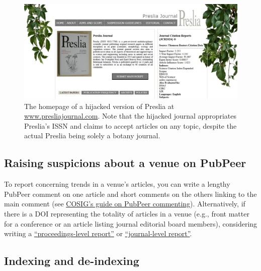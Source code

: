 \documentclass[letterpaper, 12pt]{article}
\begin{document}
\begin{figure}[h!tbp]
    \centering
    \includegraphics[width=\textwidth]{img/venues/Preslia hijacked-min.png}
    \caption*{The homepage of a hijacked version of Preslia at \href{https://presliajournal.com/}{www.presliajournal.com}. Note that the hijacked journal appropriates Preslia's ISSN and claims to accept articles on any topic, despite the actual Preslia being solely a botany journal.}
\end{figure}

\subsection*{Raising suspicions about a venue on PubPeer}

To report concerning trends in a venue's articles, you can write a lengthy PubPeer comment on one article
and short comments on the others linking to the main comment (see \href{https://osf.io/sghaq}{COSIG's guide on PubPeer commenting}).
Alternatively, if there is a DOI representing the totality of articles in a venue (e.g., front matter for a conference or an article listing journal editorial board members), considering writing a \href{https://pubpeer.com/search?q=\%22proceedings-level+report\%22}{``proceedings-level report''} or \href{https://pubpeer.com/search?q=\%22journal-level+report\%22}{``journal-level report''}.

\subsection*{Indexing and de-indexing}
\end{document}
